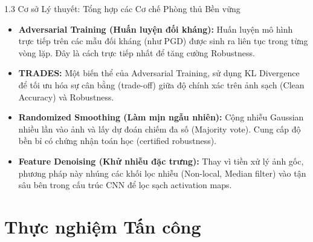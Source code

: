 \documentclass[10pt, xcolor=table]{beamer}
\begin{document}
\begin{frame}{1.3 Cơ sở Lý thuyết: Tổng hợp các Cơ chế Phòng thủ Bền vững}
    \begin{itemize}
        \item \textbf{Adversarial Training (Huấn luyện đối kháng):} Huấn luyện mô hình trực tiếp trên các mẫu đối kháng (như PGD) được sinh ra liên tục trong từng vòng lặp. Đây là cách trực tiếp nhất để tăng cường Robustness.
        \item \textbf{TRADES:} Một biến thể của Adversarial Training, sử dụng KL Divergence để tối ưu hóa sự cân bằng (trade-off) giữa độ chính xác trên ảnh sạch (Clean Accuracy) và Robustness.
        \item \textbf{Randomized Smoothing (Làm mịn ngẫu nhiên):} Cộng nhiễu Gaussian nhiều lần vào ảnh và lấy dự đoán chiếm đa số (Majority vote). Cung cấp độ bền bỉ có chứng nhận toán học (certified robustness).
        \item \textbf{Feature Denoising (Khử nhiễu đặc trưng):} Thay vì tiền xử lý ảnh gốc, phương pháp này nhúng các khối lọc nhiễu (Non-local, Median filter) vào tận sâu bên trong cấu trúc CNN để lọc sạch activation maps.
    \end{itemize}
\end{frame}

\section{Thực nghiệm Tấn công}
\end{document}
